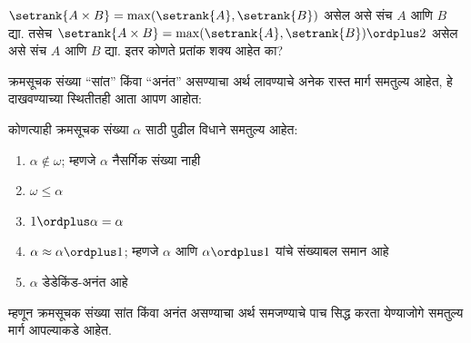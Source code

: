 \begin{prob}
$\setrank{A \times B}=
\max(\setrank{A}, \setrank{B})$ असेल असे संच $A$ आणि $B$ द्या. तसेच $\setrank{A \times B}= \max(\setrank{A}, \setrank{B}) \ordplus  2$ असेल असे संच $A$ आणि $B$ द्या. इतर कोणते प्रतांक शक्य आहेत का?
\end{prob}

क्रमसूचक संख्या “सांत” किंवा “अनंत” असण्याचा अर्थ लावण्याचे अनेक रास्त मार्ग समतुल्य आहेत, हे दाखवण्याच्या स्थितीतही आता आपण आहोत:

\begin{lem}\label{sth:ord-arithmetic:using-addition:ordinfinitycharacter}
कोणत्याही क्रमसूचक संख्या $\alpha$ साठी पुढील विधाने समतुल्य आहेत:
\begin{enumerate}
  \item\label{sth:ord-arithmetic:using-addition:ord:notinomega} $\alpha\notin \omega$; म्हणजे $\alpha$ नैसर्गिक संख्या नाही
  \item\label{sth:ord-arithmetic:using-addition:ord:omegaplus} $\omega \leq \alpha$
  \item\label{sth:ord-arithmetic:using-addition:ord:oneplus} $1 \ordplus  \alpha = \alpha$

  \item\label{sth:ord-arithmetic:using-addition:ord:plusone} $\alpha \approx \alpha\ordplus 1$; म्हणजे $\alpha$ आणि $\alpha\ordplus 1$ यांचे संख्याबल समान आहे
  \item\label{sth:ord-arithmetic:using-addition:ord:infinite} $\alpha$ डेडेकिंड-अनंत आहे
  \end{enumerate}
\end{lem}
\noindent
म्हणून क्रमसूचक संख्या सांत किंवा अनंत असण्याचा अर्थ समजण्याचे पाच सिद्ध करता येण्याजोगे समतुल्य मार्ग आपल्याकडे आहेत.

